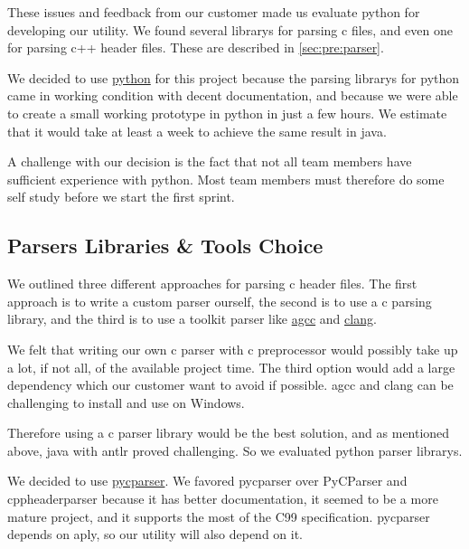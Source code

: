 These issues and feedback from our customer made us evaluate \Gls{python} for
developing our \gls{utility}. We found several \glspl{library} for parsing \Gls{c} files, and
even one for parsing \Gls{c++} \gls{header} files. These are described in
\autoref{sec:pre:parser}.

We decided to use \hyperref[sec:pre:python]{\Gls{python}} for this project because
the parsing \glspl{library} for \Gls{python} came in working condition with decent
documentation, and because we were able to create a small working prototype
in \Gls{python} in just a few hours. We estimate that it would take at least a week
to achieve the same result in \Gls{java}.

A challenge with our decision is the fact that not all team members have
sufficient experience with \Gls{python}. Most team members must therefore do some
self study before we start the first sprint.

\subsection{Parsers Libraries \& Tools Choice}
\label{sec:pre:parserchoice}
We outlined three different approaches for parsing \Gls{c} \gls{header} files. The first approach is to
write a custom \gls{parser} ourself, the second is to use a \Gls{c} parsing \gls{library}, and the
third is to use a toolkit \gls{parser} like \hyperref[sec:pre:gcc]{\Gls{agcc}} and
\hyperref[sec:pre:clang]{\Gls{clang}}.

We felt that writing our own \Gls{c} \gls{parser} with \Gls{c} \gls{preprocessor} would possibly take
up a lot, if not all, of the available project time. The third option would add
a large dependency which our customer want to avoid if possible. \Gls{agcc} and \Gls{clang}
can be challenging to install and use on Windows.

Therefore using a \Gls{c} \gls{parser} \gls{library} would be the best solution, and as mentioned
above, \Gls{java} with \gls{antlr} proved challenging. So we evaluated \Gls{python} \gls{parser}
\glspl{library}.

We decided to use \hyperref[sec:pre:pycparser]{\gls{pycparser}}. We favored \gls{pycparser}
over PyCParser and cppheaderparser because it has better documentation, it
seemed to be a more mature project, and it supports the most of the \Gls{C99}
specification. \gls{pycparser} depends on \Gls{aply}, so our \gls{utility} will also depend on it.


